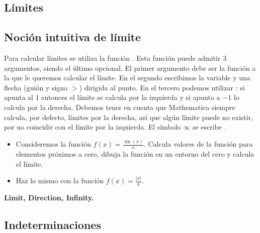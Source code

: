 \documentclass[a4paper,10pt, draft]{article}
\newcommand{\com}[1]{\textbf{\color{blue}{#1}}}
\newenvironment{capitulo}{\begin{tcolorbox}[colback=red!5!white,colframe=red!75!black]}{\end{tcolorbox}\bigskip}
\newenvironment{ejer}{\begin{tcolorbox}[center title, title=Ejercicios,
fonttitle=\sffamily\bfseries,colback=blue!5,colframe=orange]}{\end{tcolorbox}}
\newenvironment{funciones}{\begin{tcolorbox}[center title, title=Nuevas funciones, fonttitle=\sffamily\bfseries, colback=green!5!white,colframe=red!75!black]}{\end{tcolorbox}\bigskip}
\begin{document}
\begin{capitulo}

\section{Límites}


\end{capitulo}

\subsection{Noción intuitiva de límite}

Para calcular límites se utiliza la función \com{Limit[f,$x\rightarrow x_0$]}. Esta función puede admitir 3 argumentos, siendo el último opcional. El primer argumento debe ser la función a la que le queremos calcular el límite. En el segundo escribimos la variable  y una flecha (guión y signo $>$) dirigida al punto. En el tercero podemos utilizar \com{Direction}: si apunta al $1$ entonces el límite se calcula por la izquierda y si apunta a $-1$ lo calcula por la derecha. Debemos tener en cuenta que Mathematica siempre calcula, por defecto, límites por la derecha, así que algún límite puede no existir, por no coincidir con el límite por la izquierda.  El símbolo $\infty$ se escribe \com{Infinity}.

\begin{ejer}

\begin{itemize}

\item Consideremos la función $f(x)=\displaystyle \frac{\sin(x)}{x}$. Calcula valores de la función para elementos próximos a cero, dibuja la función en un entorno del cero y calcula el límite. 

\item Haz lo mismo con la función $f(x)=\displaystyle \frac{|x|}{x}$.

\end{itemize}

\end{ejer} 

\begin{funciones}

\textbf{Limit, Direction, Infinity.}

\end{funciones}

 \newpage


\subsection{Indeterminaciones}
 
\end{document}
